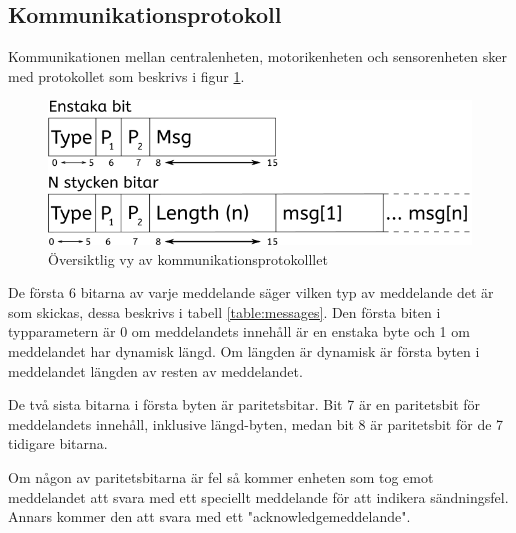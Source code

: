 \documentclass[a4paper,titlepage,12pt]{article}
\begin{document}
	\subsection{Kommunikationsprotokoll}
	\label{ssub:Kommunikationsprotokoll}
	Kommunikationen mellan centralenheten, motorikenheten och sensorenheten sker 
	med protokollet som beskrivs i figur \ref{fig:kommunikation1}.

	\newpage
	\begin{figure}[h!]
		\centering
		\includegraphics[width=0.5\linewidth]{images/communication_protocol1.png}
		\caption{Översiktlig vy av kommunikationsprotokolllet}
		\label{fig:kommunikation1}
	\end{figure}

	De första 6 bitarna av varje meddelande säger vilken typ av meddelande det är som
	skickas, dessa beskrivs i tabell 
	\ref{table:messages}. Den första biten i typparametern är 0 om meddelandets
	innehåll är en enstaka byte och 1 om meddelandet har dynamisk längd. Om längden
	är dynamisk är första byten i meddelandet längden av resten av meddelandet.

	De två sista bitarna i första byten är paritetsbitar. Bit 7 är en  paritetsbit
	för meddelandets innehåll, inklusive längd-byten, medan bit 8 är paritetsbit för de 7 tidigare bitarna.

	Om någon av paritetsbitarna är fel så kommer enheten som tog emot meddelandet att svara
	med ett speciellt meddelande för att indikera sändningsfel. Annars kommer den 
	att svara med ett "acknowledgemeddelande".
\end{document}
